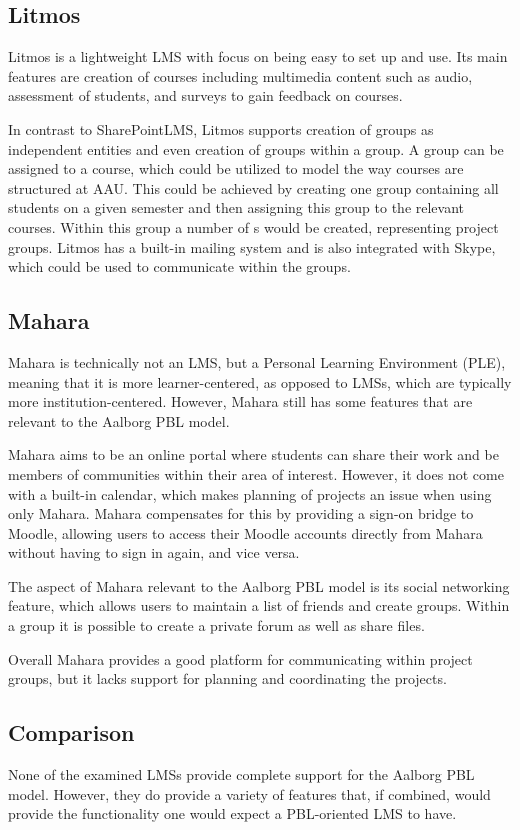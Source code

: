 \subsection{Litmos}
Litmos \citep{litmos} is a lightweight LMS with focus on being easy to set up and use.
Its main features are creation of courses including multimedia content such as audio, assessment of students, and surveys to gain feedback on courses.

In contrast to SharePointLMS, Litmos supports creation of groups as independent entities and even creation of groups within a group.
A group can be assigned to a course, which could be utilized to model the way courses are structured at AAU.
This could be achieved by creating one group containing all students on a given semester and then assigning this group to the relevant courses.
Within this group a number of \subgroup{}s would be created, representing project groups.
Litmos has a built-in mailing system and is also integrated with Skype, which could be used to communicate within the groups.


\subsection{Mahara}
Mahara \citep{mahara} is technically not an LMS, but a Personal Learning Environment (PLE), meaning that it is more learner-centered, as opposed to LMSs, which are typically more institution-centered.
However, Mahara still has some features that are relevant to the Aalborg PBL model.

Mahara aims to be an online portal where students can share their work and be members of communities within their area of interest.
However, it does not come with a built-in calendar, which makes planning of projects an issue when using only Mahara.
Mahara compensates for this by providing a sign-on bridge to Moodle, allowing users to access their Moodle accounts directly from Mahara without having to sign in again, and vice versa.

The aspect of Mahara relevant to the Aalborg PBL model is its social networking feature, which allows users to maintain a list of friends and create groups.
Within a group it is possible to create a private forum as well as share files.

Overall Mahara provides a good platform for communicating within project groups, but it lacks support for planning and coordinating the projects.

\subsection{Comparison}
None of the examined LMSs provide complete support for the Aalborg PBL model.
However, they do provide a variety of features that, if combined, would provide the functionality one would expect a PBL-oriented LMS to have.

